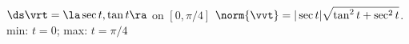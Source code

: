{$\ds \vrt = \la \sec t,\tan t \ra$ on $[0,\pi/4]$
}
{
$\norm{\vvt} = |\sec t|\sqrt{\tan^2t+\sec^2t}$. \\
min: $t=0$; max: $t=\pi/4$
}